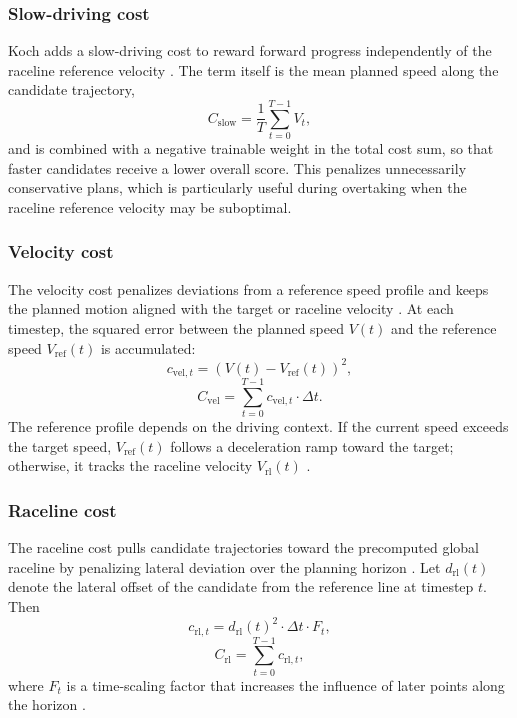 \subsubsection{Slow-driving cost}
Koch adds a slow-driving cost to reward forward progress independently of the raceline reference velocity \cite{koch_DifferentiableInterpretablePath_2025}.
The term itself is the mean planned speed along the candidate trajectory,
\begin{equation}
    C_{\text{slow}} = \frac{1}{T}\sum_{t=0}^{T-1} V_t,
\end{equation}
and is combined with a negative trainable weight in the total cost sum, so that faster candidates receive a lower overall score.
This penalizes unnecessarily conservative plans, which is particularly useful during overtaking when the raceline reference velocity may be suboptimal.

\subsubsection{Velocity cost}
The velocity cost penalizes deviations from a reference speed profile and keeps the planned motion aligned with the target or raceline velocity \cite{swadiryus_DifferentiableMotionPlanning_2025, koch_DifferentiableInterpretablePath_2025}.
At each timestep, the squared error between the planned speed $V(t)$ and the reference speed $V_{\text{ref}}(t)$ is accumulated:
\begin{equation}
    c_{\text{vel}, t} = \left(V(t) - V_{\text{ref}}(t)\right)^2,
\end{equation}
\begin{equation}
    C_{\text{vel}} = \sum_{t=0}^{T-1} c_{\text{vel}, t} \cdot \Delta t.
\end{equation}
The reference profile depends on the driving context.
If the current speed exceeds the target speed, $V_{\text{ref}}(t)$ follows a deceleration ramp toward the target; otherwise, it tracks the raceline velocity $V_{\text{rl}}(t)$ \cite{swadiryus_DifferentiableMotionPlanning_2025}.

\subsubsection{Raceline cost}
The raceline cost pulls candidate trajectories toward the precomputed global raceline by penalizing lateral deviation over the planning horizon \cite{swadiryus_DifferentiableMotionPlanning_2025, koch_DifferentiableInterpretablePath_2025}.
Let $d_{\text{rl}}(t)$ denote the lateral offset of the candidate from the reference line at timestep $t$.
Then
\begin{equation}
    c_{\text{rl}, t} = d_{\text{rl}}(t)^2 \cdot \Delta t \cdot F_t,
\end{equation}
\begin{equation}
    C_{\text{rl}} = \sum_{t=0}^{T-1} c_{\text{rl}, t},
\end{equation}
where $F_t$ is a time-scaling factor that increases the influence of later points along the horizon \cite{swadiryus_DifferentiableMotionPlanning_2025}.

